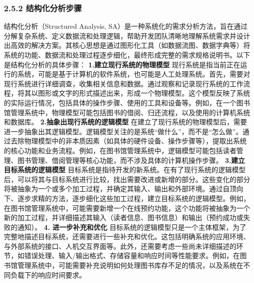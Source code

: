 \subsubsection{2.5.2 结构化分析步骤}\label{ux7ed3ux6784ux5316ux5206ux6790ux6b65ux9aa4} 结构化分析（Structured Analysis,
SA）是一种系统化的需求分析方法，旨在通过分解复杂系统、定义数据流和处理逻辑，帮助开发团队清晰地理解系统需求并设计出高效的解决方案。其核心思想是通过图形化工具（如数据流图、数据字典等）将系统的功能、数据流和处理过程逐步细化，最终形成完整的需求规格说明书。以下是结构化分析的具体步骤：
\textbf{1.建立现行系统的物理模型}
现行系统是指当前正在运行的系统，可能是基于计算机的软件系统，也可能是人工处理系统。首先，需要对现行系统进行详细调查，收集相关信息和数据。通过观察和记录现行系统的工作流程，将其以图形或文字的形式描述出来，形成一个物理模型。这个模型反映了系统的实际运行情况，包括具体的操作步骤、使用的工具和设备等。例如，在一个图书馆管理系统中，物理模型可能包括图书的借阅、归还流程，以及使用的计算机系统和数据库。
\textbf{2.抽象出现行系统的逻辑模型}
在建立了现行系统的物理模型后，需要进一步抽象出其逻辑模型。逻辑模型关注的是系统``做什么''，而不是``怎么做''。通过去除物理模型中的非本质因素（如具体的硬件设备、操作步骤等），提取出系统的核心功能和业务流程。例如，在图书馆管理系统中，逻辑模型可能包括读者管理、图书管理、借阅管理等核心功能，而不涉及具体的计算机操作步骤。
\textbf{3.建立目标系统的逻辑模型}
目标系统是指待开发的新系统。在有了现行系统的逻辑模型后，可以将其与目标系统进行比较，找出需要改进或新增的部分。这些变化的部分将被抽象为一个或多个加工过程，并确定其输入、输出和外部环境。通过自顶向下、逐步求精的方法，逐步细化这些加工过程，建立目标系统的逻辑模型。例如，在图书馆管理系统中，可能需要新增一个在线预约功能，这个功能将被抽象为一个新的加工过程，并详细描述其输入（读者信息、图书信息）和输出（预约成功或失败的通知）。
\textbf{4. 进一步补充和优化}
目标系统的逻辑模型只是一个主体框架，为了完整地描述目标系统，还需要进行一些补充和优化。这包括明确系统的应用环境、与外部系统的接口、人机交互界面等。此外，还需要考虑一些尚未详细描述的环节，如错误处理、输入/输出格式、存储容量和响应时间等性能要求。例如，在图书馆管理系统中，可能需要补充说明如何处理图书库存不足的情况，以及系统在不同负载下的响应时间要求。
